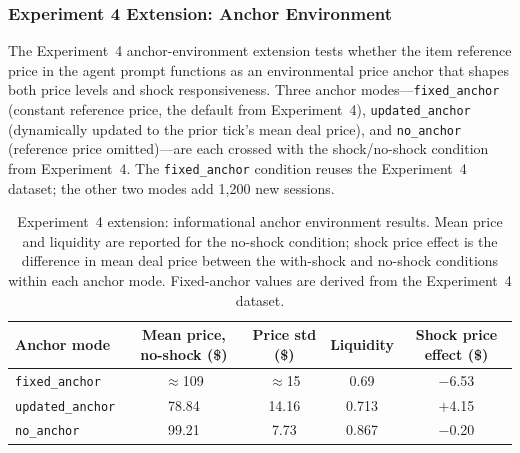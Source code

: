 \subsubsection{Experiment 4 Extension: Anchor Environment}
\label{sec:results-anchor}

The Experiment~4 anchor-environment extension tests whether the item reference price in the agent prompt functions as an environmental price anchor that shapes both price levels and shock responsiveness.  Three anchor modes---\texttt{fixed\_anchor} (constant reference price, the default from Experiment~4), \texttt{updated\_anchor} (dynamically updated to the prior tick's mean deal price), and \texttt{no\_anchor} (reference price omitted)---are each crossed with the shock/no-shock condition from Experiment~4.  The \texttt{fixed\_anchor} condition reuses the Experiment~4 dataset; the other two modes add 1{,}200 new sessions.

\begin{table}[ht]
\centering
\caption{Experiment~4 extension: informational anchor environment results.  Mean price and liquidity are reported for the no-shock condition; shock price effect is the difference in mean deal price between the with-shock and no-shock conditions within each anchor mode.  Fixed-anchor values are derived from the Experiment~4 dataset.}
\label{tab:anchor-environment}
\begin{tabular}{@{}lcccc@{}}
\toprule
Anchor mode & Mean price, no-shock (\$) & Price std (\$) & Liquidity & Shock price effect (\$) \\
\midrule
\texttt{fixed\_anchor}   & $\approx$109 & $\approx$15  & 0.69 & $-$6.53 \\
\texttt{updated\_anchor} & 78.84    & 14.16 & 0.713 & $+$4.15 \\
\texttt{no\_anchor}      & 99.21    & 7.73  & 0.867 & $-$0.20 \\
\bottomrule
\end{tabular}
\end{table}

